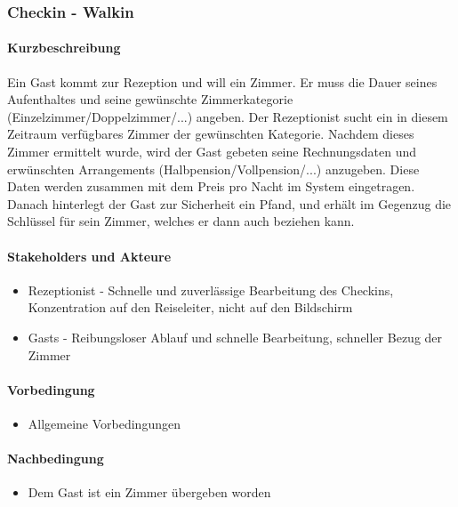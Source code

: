 \subsubsection{Checkin - Walkin}

\paragraph{Kurzbeschreibung}
Ein \Gls{Gast} kommt zur \Gls{Rezeption} und will ein \Gls{Zimmer}. Er muss die Dauer seines Aufenthaltes und seine gewünschte Zimmerkategorie (Einzelzimmer/Doppelzimmer/...) angeben. Der \Gls{Rezeptionist} sucht ein in diesem Zeitraum verfügbares \Gls{Zimmer} der gewünschten Kategorie. Nachdem dieses \Gls{Zimmer} ermittelt wurde, wird der \Gls{Gast} gebeten seine Rechnungsdaten und erwünschten \Gls{Arrangement}s (Halbpension/Vollpension/...) anzugeben. Diese Daten werden zusammen mit dem Preis pro Nacht im System eingetragen. Danach hinterlegt der \Gls{Gast} zur Sicherheit ein Pfand, und erhält im Gegenzug die Schlüssel für sein \Gls{Zimmer}, welches er dann auch beziehen kann.

\paragraph{Stakeholders und Akteure}
\begin{itemize}
	\item \Gls{Rezeptionist} - Schnelle und zuverlässige Bearbeitung des \Gls{Checkin}s, Konzentration auf den  \Gls{Reiseleiter}, nicht auf den Bildschirm
	\item \Glspl{Gast} - Reibungsloser Ablauf und schnelle Bearbeitung, schneller Bezug der \Gls{Zimmer}
\end{itemize}

\paragraph{Vorbedingung}
\begin{itemize}
	\item Allgemeine Vorbedingungen
\end{itemize}

\paragraph{Nachbedingung}
\begin{itemize}
	\item Dem Gast ist ein Zimmer übergeben worden
\end{itemize}

